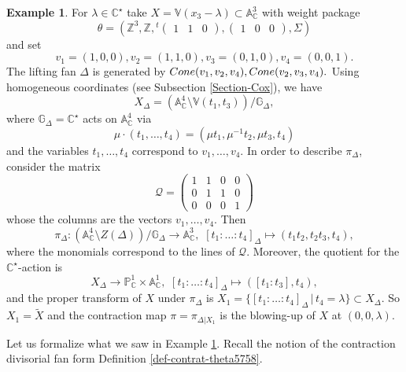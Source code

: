 \documentclass[11pt, reqno]{amsart}
\theoremstyle{plain}
\theoremstyle{definition}
\newtheorem{example}[theorem]{Example}
\theoremstyle{remark}
\begin{document}
\begin{example}\label{ex-Delta}
For $\lambda\in \mathbb{C}^{\star}$ take $X  =  \mathbb{V}(x_{3}-\lambda)\subset \mathbb{A}_{\mathbb{C}}^{3}$
with weight package 
$$\theta  =  \left(\mathbb{Z}^{3}, \mathbb{Z}, {}^{t}\begin{pmatrix}
 1  & 1 & 0
\end{pmatrix}, \begin{pmatrix}
1  & 0 & 0
\end{pmatrix}, 
\Sigma\right)$$
and set 
$$
v_{1} =  (1,0,0), v_{2} =  (1,1, 0), v_{3} =  (0, 1,0), v_{4} =  (0,0,1).$$
The lifting fan $\Delta$ is  generated by 
${\rm Cone}(v_{1}, v_{2} ,v_{4}), {\rm Cone}(v_{2}, v_{3}, v_{4}).$ Using
homogeneous coordinates (see Subsection \ref{Section-Cox}),
we have $$X_{\Delta} = (\mathbb{A}^{4}_{\mathbb{C}}\setminus \mathbb{V}(t_{1}, t_{3}))/\mathbb{G}_{\Delta},$$
where $\mathbb{G}_{\Delta} =  \mathbb{C}^{\star}$ acts on $\mathbb{A}_{\mathbb{C}}^{4}$ via 
$$\mu\cdot (t_{1}, \ldots,t_{4}) =  (\mu t_{1}, \mu^{-1} t_{2}, \mu t_{3}, t_{4})$$
and the variables $t_{1}, \ldots, t_{4}$ correspond to $v_{1}, \ldots, v_{4}$. 
In order to describe $\pi_{\Delta}$, consider the matrix 
$$\mathscr{Q} =  \begin{pmatrix}
 1& 1  &  0 &  0\\
 0& 1  &  1 &  0\\
 0 & 0 &  0&  1
\end{pmatrix}$$
whose the columns are the vectors $v_{1}, \ldots, v_{4}$. Then
$$ \pi_{\Delta} :(\mathbb{A}^{4}_{\mathbb{C}}\setminus Z(\Delta))/\mathbb{G}_{\Delta}\rightarrow \mathbb{A}_{\mathbb{C}}^{3}, \,\, [t_{1}:\ldots: t_{4}]_{\Delta}\mapsto (t_{1}t_{2}, t_{2}t_{3}, t_{4}),$$
where the monomials correspond to the lines of $\mathscr{Q}$. Moreover, the quotient for the $\mathbb{C}^{\star}$-action is
$$X_{\Delta}\rightarrow \mathbb{P}^{1}_{\mathbb{C}}\times \mathbb{A}^{1}_{\mathbb{C}},\,\, [t_{1}:\ldots:t_{4}]_{\Delta}\mapsto ([t_{1}: t_{3}], t_{4}),$$
and the proper transform of $X$ under $\pi_{\Delta}$ is 
$X_{1} =  \{[t_{1}: \ldots: t_{4}]_{\Delta}\, |\, t_{4} =  \lambda\}\subset X_{\Delta}.$
So $X_{1}  =  \widetilde{X}$ and the contraction map $\pi = \pi_{\Delta|X_{1}}$ is the blowing-up of $X$ at $(0,0, \lambda)$. 
\end{example}
Let us formalize what we saw in Example \ref{ex-Delta}. Recall the notion of the contraction divisorial fan form Definition \ref{def-contrat-theta5758}.
\end{document}

